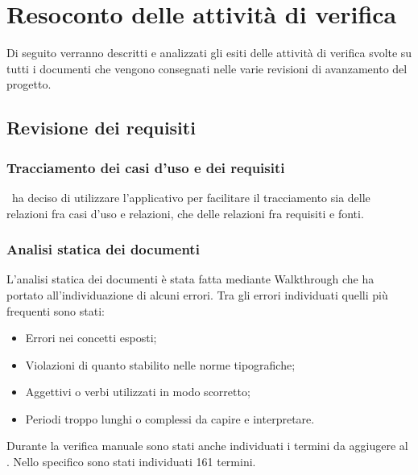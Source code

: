 \documentclass[../PianoDiQualifica.tex]{subfiles}
\begin{document}
	\appendix
	\section{Resoconto delle attività di verifica}
	Di seguito verranno descritti e analizzati gli esiti delle attività di verifica svolte su tutti i documenti che vengono consegnati nelle varie revisioni di avanzamento del progetto.
	
		\subsection{Revisione dei requisiti}
			\subsubsection{Tracciamento dei casi d'uso e dei requisiti}
			\kpanic\ ha deciso di utilizzare l'applicativo  per facilitare il tracciamento sia delle relazioni fra casi d'uso e relazioni, che delle relazioni fra requisiti e fonti.
			
			\subsubsection{Analisi statica dei documenti}
			L'analisi statica dei documenti è stata fatta mediante Walkthrough che ha portato all'individuazione di alcuni errori. Tra gli errori individuati quelli più frequenti sono stati:
			\begin{itemize}
				\item Errori nei concetti esposti;
				\item Violazioni di quanto stabilito nelle norme tipografiche;
				\item Aggettivi o verbi utilizzati in modo scorretto;
				\item Periodi troppo lunghi o complessi da capire e interpretare.
			\end{itemize}
			Durante la verifica manuale sono stati anche individuati i termini da aggiugere al \glossariov. Nello specifico sono stati individuati 161 termini.
			
\end{document}

